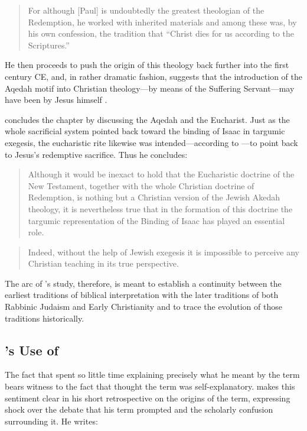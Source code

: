 \begin{quote}
For although {[}Paul{]} is undoubtedly the greatest theologian of the
Redemption, he worked with inherited materials and among these was, by
his own confession, the tradition that ``Christ dies for us according to
the Scriptures.''\autocite[221]{vermes1961}
\end{quote}

He then proceeds to push the origin of this theology back further into
the first century CE, and, in rather dramatic fashion, suggests that the
introduction of the Aqedah motif into Christian theology---by means of
the Suffering Servant---may have been by Jesus himself
\autocite[223]{vermes1961}.

\vermes concludes the chapter by discussing the Aqedah
and the Eucharist. Just as the whole sacrificial system pointed back
toward the binding of Isaac in targumic exegesis, the eucharistic rite
likewise was intended---according to \vermes---to point
back to Jesus's redemptive sacrifice. Thus he concludes:

\begin{quote}
Although it would be inexact to hold that the Eucharistic doctrine of
the New Testament, together with the whole Christian doctrine of
Redemption, is nothing but a Christian version of the Jewish Akedah
theology, it is nevertheless true that in the formation of this doctrine
the targumic representation of the Binding of Isaac has played an
essential role.
\end{quote}

\begin{quote}
Indeed, without the help of Jewish exegesis it is impossible to perceive
any Christian teaching in its true
perspective.\autocite[227]{vermes1961}
\end{quote}

The arc of \vermes's study, therefore, is meant to
establish a continuity between the earliest traditions of biblical
interpretation with the later traditions of both Rabbinic Judaism and
Early Christianity and to trace the evolution of those traditions
historically.

\hypertarget{vermess-use-of-rwb}{%
\subsection{\vermes's Use of
\RWB}\label{vermess-use-of-rwb}}

The fact that \vermes spent so little time explaining
precisely what he meant by the term \rwb bears witness
to the fact that \vermes thought the term was
self-explanatory. \vermes makes this sentiment clear in
his short retrospective on the origins of the term, expressing shock
over the debate that his term prompted and the scholarly confusion
surrounding it. He writes:

